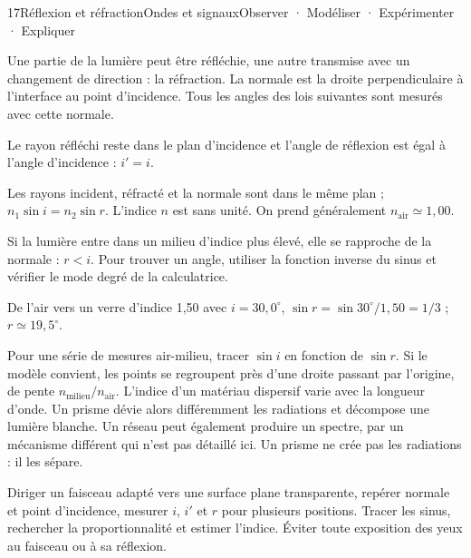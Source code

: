 \begin{ouverture}[lunette]{17}{Réflexion et réfraction}{Ondes et signaux}{Observer · Modéliser · Expérimenter · Expliquer}
\end{ouverture}
\essentiel
{}
Une partie de la lumière peut être réfléchie, une autre transmise avec un changement de direction : la réfraction. La normale est la droite perpendiculaire à l'interface au point d'incidence. Tous les angles des lois suivantes sont mesurés avec cette normale.
\begin{loi}[Réflexion]Le rayon réfléchi reste dans le plan d'incidence et l'angle de réflexion est égal à l'angle d'incidence : $i'=i$.\end{loi}
\begin{loi}Les rayons incident, réfracté et la normale sont dans le même plan ; $n_1\sin i=n_2\sin r$. L'indice $n$ est sans unité. On prend généralement $n_{\mathrm{air}}\simeq1,00$.\end{loi}
Si la lumière entre dans un milieu d'indice plus élevé, elle se rapproche de la normale : $r<i$. Pour trouver un angle, utiliser la fonction inverse du sinus et vérifier le mode degré de la calculatrice.
\begin{exemple}De l'air vers un verre d'indice 1,50 avec $i=30,0^\circ$, $\sin r=\sin30^\circ/1,50=1/3$ ; $r\simeq19,5^\circ$.\end{exemple}
Pour une série de mesures air-milieu, tracer $\sin i$ en fonction de $\sin r$. Si le modèle convient, les points se regroupent près d'une droite passant par l'origine, de pente $n_{\mathrm{milieu}}/n_{\mathrm{air}}$.
L'indice d'un matériau dispersif varie avec la longueur d'onde. Un prisme dévie alors différemment les radiations et décompose une lumière blanche. Un réseau peut également produire un spectre, par un mécanisme différent qui n'est pas détaillé ici. Un prisme ne crée pas les radiations : il les sépare.
\begin{experience}Diriger un faisceau adapté vers une surface plane transparente, repérer normale et point d'incidence, mesurer $i$, $i'$ et $r$ pour plusieurs positions. Tracer les sinus, rechercher la proportionnalité et estimer l'indice. Éviter toute exposition des yeux au faisceau ou à sa réflexion.\end{experience}
